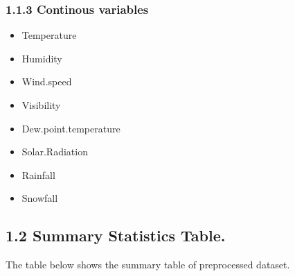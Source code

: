 \documentclass[
]{article}
\providecommand{\tightlist}{%
  \setlength{\itemsep}{0pt}\setlength{\parskip}{0pt}}
\begin{document}
\hypertarget{continous-variables}{%
\subsubsection{1.1.3 Continous variables}\label{continous-variables}}

\begin{itemize}
\tightlist
\item
  Temperature
\item
  Humidity
\item
  Wind.speed
\item
  Visibility
\item
  Dew.point.temperature
\item
  Solar.Radiation
\item
  Rainfall
\item
  Snowfall
\end{itemize}

\hypertarget{summary-statistics-table.}{%
\subsection{1.2 Summary Statistics
Table.}\label{summary-statistics-table.}}

The table below shows the summary table of preprocessed dataset.
\end{document}
